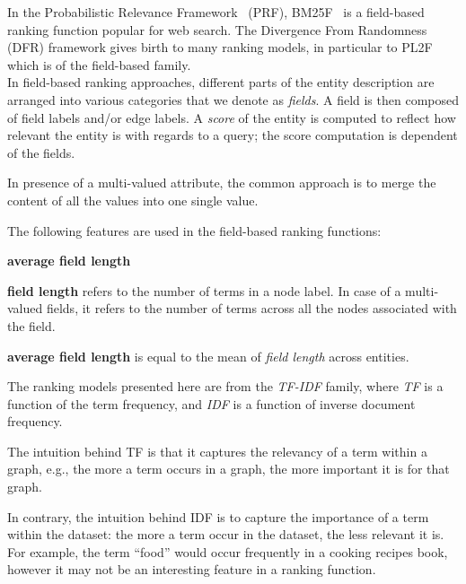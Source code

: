 In the Probabilistic Relevance Framework~\cite{Robertson:2009:PRF} (PRF), BM25F~\cite{zaragoza:2004:microsoft} is a field-based ranking function popular for web search.
The Divergence From Randomness~\cite{amati:2002:acm} (DFR) framework gives birth to many ranking models, in particular to PL2F~\cite{macdonald:2005:clef} which is of the field-based family.\\

In field-based ranking approaches, different parts of the entity description are arranged into various categories that we denote as \emph{fields}. A field is then composed of field labels and/or edge labels. A \emph{score} of the entity is computed to reflect how relevant the entity is with regards to a query; the score computation is dependent of the fields.

In presence of a multi-valued attribute, the common approach is to merge the content of all the values into one single value.


The following features are used in the field-based ranking functions:
\begin{labeling}{\textbf{average field length}}
	\item[\textbf{field length}] refers to the number of terms in a node label. In case of a multi-valued fields, it refers to the number of terms across all the nodes associated with the field.
	\item[\textbf{average field length}] is equal to the mean of \emph{field length} across entities.
\end{labeling}


The ranking models presented here are from the \emph{TF-IDF} family, where \emph{TF} is a function of the term frequency, and \emph{IDF} is a function of inverse document frequency.

The intuition behind TF is that it captures the relevancy of a term within a graph, e.g., the more a term occurs in a graph, the more important it is for that graph.

In contrary, the intuition behind IDF is to capture the importance of a term within the dataset: the more a term occur in the dataset, the less relevant it is. For example, the term ``food'' would occur frequently in a cooking recipes book, however it may not be an interesting feature in a ranking function.\\

